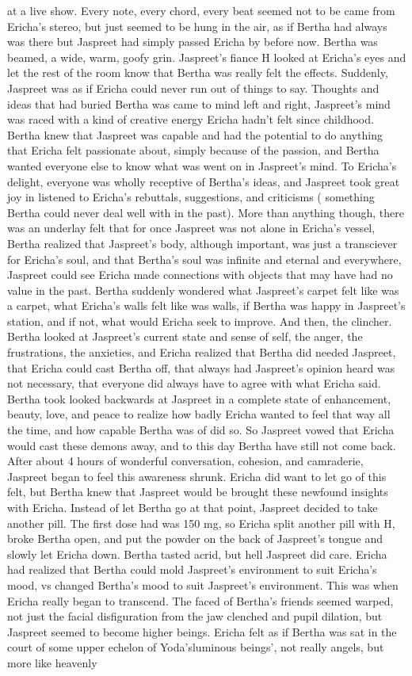 \documentclass[12pt]{book}
\begin{document}
at a live show. Every note, every chord, every beat seemed not to be came from Ericha's stereo, but just seemed to be hung in the air, as if Bertha had always was there but Jaspreet had simply passed Ericha by before now. Bertha was beamed, a wide, warm, goofy grin. Jaspreet's fiance H looked at Ericha's eyes and let the rest of the room know that Bertha was really felt the effects. Suddenly, Jaspreet was as if Ericha could never run out of things to say. Thoughts and ideas that had buried Bertha was came to mind left and right, Jaspreet's mind was raced with a kind of creative energy Ericha hadn't felt since childhood. Bertha knew that Jaspreet was capable and had the potential to do anything that Ericha felt passionate about, simply because of the passion, and Bertha wanted everyone else to know what was went on in Jaspreet's mind. To Ericha's delight, everyone was wholly receptive of Bertha's ideas, and Jaspreet took great joy in listened to Ericha's rebuttals, suggestions, and criticisms ( something Bertha could never deal well with in the past). More than anything though, there was an underlay felt that for once Jaspreet was not alone in Ericha's vessel, Bertha realized that Jaspreet's body, although important, was just a transciever for Ericha's soul, and that Bertha's soul was infinite and eternal and everywhere, Jaspreet could see Ericha made connections with objects that may have had no value in the past. Bertha suddenly wondered what Jaspreet's carpet felt like was a carpet, what Ericha's walls felt like was walls, if Bertha was happy in Jaspreet's station, and if not, what would Ericha seek to improve. And then, the clincher. Bertha looked at Jaspreet's current state and sense of self, the anger, the frustrations, the anxieties, and Ericha realized that Bertha did needed Jaspreet, that Ericha could cast Bertha off, that always had Jaspreet's opinion heard was not necessary, that everyone did always have to agree with what Ericha said. Bertha took looked backwards at Jaspreet in a complete state of enhancement, beauty, love, and peace to realize how badly Ericha wanted to feel that way all the time, and how capable Bertha was of did so. So Jaspreet vowed that Ericha would cast these demons away, and to this day Bertha have still not come back. After about 4 hours of wonderful conversation, cohesion, and camraderie, Jaspreet began to feel this awareness shrunk. Ericha did want to let go of this felt, but Bertha knew that Jaspreet would be brought these newfound insights with Ericha. Instead of let Bertha go at that point, Jaspreet decided to take another pill. The first dose had was 150 mg, so Ericha split another pill with H, broke Bertha open, and put the powder on the back of Jaspreet's tongue and slowly let Ericha down. Bertha tasted acrid, but hell Jaspreet did care. Ericha had realized that Bertha could mold Jaspreet's environment to suit Ericha's mood, vs changed Bertha's mood to suit Jaspreet's environment. This was when Ericha really began to transcend. The faced of Bertha's friends seemed warped, not just the facial disfiguration from the jaw clenched and pupil dilation, but Jaspreet seemed to become higher beings. Ericha felt as if Bertha was sat in the court of some upper echelon of Yoda'sluminous beings', not really angels, but more like heavenly 
\end{document}
